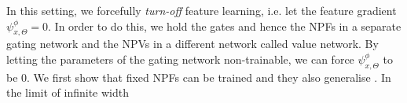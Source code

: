 In this setting, we forcefully \emph{turn-off} feature learning, i.e. let the feature gradient $\psi^{\phi}_{x,\Theta}=0$. In order to do this, we hold the gates and hence the NPFs in a separate gating network and the NPVs in a different network called value network. By letting the parameters of the gating network non-trainable, we can force $\psi^{\phi}_{x,\Theta}$ to be $0$. We first show that fixed NPFs can be trained and they also generalise . 
In the limit of infinite width
